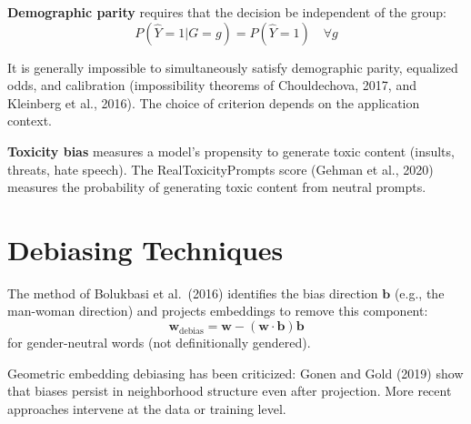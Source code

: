 \begin{definition}
\textbf{Demographic parity} requires that the decision be independent
of the group:
\[
    P(\hat{Y} = 1 | G = g) = P(\hat{Y} = 1) \quad \forall g
\]
\end{definition}

\begin{attention}[title=\textbf{Incompatibility of Fairness Criteria}]
It is generally impossible to simultaneously satisfy demographic parity,
equalized odds, and calibration (impossibility theorems of
Chouldechova, 2017, and Kleinberg et al., 2016). The choice of criterion
depends on the application context.
\end{attention}

\begin{definition}
\textbf{Toxicity bias} measures a model's propensity to generate toxic
content (insults, threats, hate speech). The RealToxicityPrompts score
(Gehman et al., 2020) measures the probability of generating toxic
content from neutral prompts.
\end{definition}

\section{Debiasing Techniques}
\label{sec:ethics:debiasing}

\begin{definition}
The method of Bolukbasi et al.\ (2016) identifies the bias direction
$\mathbf{b}$ (e.g., the man-woman direction) and projects embeddings to
remove this component:
\[
    \mathbf{w}_{\text{debias}} = \mathbf{w} -
    (\mathbf{w} \cdot \mathbf{b}) \mathbf{b}
\]
for gender-neutral words (not definitionally gendered).
\end{definition}

\begin{remark}
Geometric embedding debiasing has been criticized: Gonen and Gold (2019)
show that biases persist in neighborhood structure even after projection.
More recent approaches intervene at the data or training level.
\end{remark}

